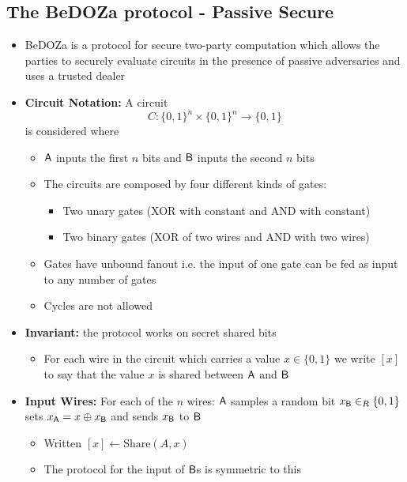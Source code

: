 \subsection{The BeDOZa protocol - Passive Secure}%
\begin{itemize}
    \item BeDOZa is a protocol for secure two-party computation which allows the parties to securely evaluate circuits in the presence of passive adversaries and uses a trusted dealer
    \item \textbf{Circuit Notation:} A circuit 
    \begin{equation*}
        C : \{0,1\}^n \times \{0,1\}^n \to \{0,1\}
    \end{equation*}
    is considered where
    \begin{itemize}
        \item $\mathsf{A}$ inputs the first $n$ bits and $\mathsf{B}$ inputs the second $n$ bits 
        \item The circuits are composed by four different kinds of gates:
        \begin{itemize}
            \item Two unary gates (XOR with constant and AND with constant)
            \item Two binary gates (XOR of two wires and AND with two wires)
        \end{itemize}
        \item Gates have unbound fanout i.e. the input of one gate can be fed as input to any number of gates
        \item Cycles are not allowed
    \end{itemize}
    \item \textbf{Invariant:} the protocol works on secret shared bits
    \begin{itemize}
        \item For each wire in the circuit which carries a value $x \in \{0,1\}$ we write $[x]$ to say that the value $x$ is shared between $\mathsf{A}$ and $\mathsf{B}$
    \end{itemize}
    \item \textbf{Input Wires:} For each of the $n$ wires: $\mathsf{A}$ samples a random bit $x_{\mathsf{B}} \in_R \{0,1\}$ sets $x_{\mathsf{A}} = x \oplus x_{\mathsf{B}}$ and sends $x_{\mathsf{B}}$ to $\mathsf{B}$
    \begin{itemize}
        \item Written $[x] \leftarrow \text{Share}(A, x)$
        \item The protocol for the input of $\mathsf{B}$s is symmetric to this

\end{itemize}
\end{itemize}
